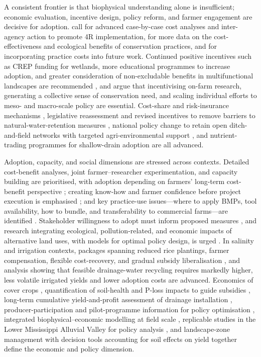 A consistent frontier is that biophysical understanding alone is insufficient; economic evaluation, incentive design, policy reform, and farmer engagement are decisive for adoption. \textcite{Liu2021} call for advanced case-by-case cost analyses and inter-agency action to promote 4R implementation, \textcite{Yuan2022} for more data on the cost-effectiveness and ecological benefits of conservation practices, and \textcite{McLellan2015} for incorporating practice costs into future work. Continued positive incentives such as CREP funding for wetlands, more educational programmes to increase adoption, and greater consideration of non-excludable benefits in multifunctional landscapes are recommended \parencite{Christianson2014}, and \textcite{David2015} argue that incentivising on-farm research, generating a collective sense of conservation need, and scaling individual efforts to meso- and macro-scale policy are essential. Cost-share and risk-insurance mechanisms \parencite{Jaynes2012,Karlen2005}, legislative reassessment and revised incentives to remove barriers to natural-water-retention measures \parencite{Kvítek2023}, national policy change to retain open ditch-and-field networks with targeted agri-environmental support \parencite{Marja2013}, and nutrient-trading programmes for shallow-drain adoption \parencite{Ghane2021b} are all advanced.

Adoption, capacity, and social dimensions are stressed across contexts. Detailed cost-benefit analyses, joint farmer--researcher experimentation, and capacity building are prioritised, with adoption depending on farmers' long-term cost-benefit perspective \parencite{Okwany2016}; creating know-how and farmer confidence before project execution is emphasised \parencite{Ghumman2011}; and key practice-use issues---where to apply BMPs, tool availability, how to bundle, and transferability to commercial farms---are identified \parencite{Ward2018}. Stakeholder willingness to adopt must inform proposed measures \parencite{Cuevas2019}, and research integrating ecological, pollution-related, and economic impacts of alternative land uses, with models for optimal policy design, is urged \parencite{Saikkonen2014}. In salinity and irrigation contexts, packages spanning reduced rice plantings, farmer compensation, flexible cost-recovery, and gradual subsidy liberalisation \parencite{Kotb2000}, and analysis showing that feasible drainage-water recycling requires markedly higher, less volatile irrigated yields and lower adoption costs \parencite{Sellars2022} are advanced. Economics of cover crops \parencite{Waring2020}, quantification of soil-health and P-loss impacts to guide subsidies \parencite{Roth2018}, long-term cumulative yield-and-profit assessment of drainage installation \parencite{Mourtzinis2021}, producer-participation and pilot-programme information for policy optimisation \parencite{Malone2023}, integrated biophysical--economic modelling at field scale \parencite{Ferin2023}, replicable studies in the Lower Mississippi Alluvial Valley for policy analysis \parencite{Kröger2012}, and landscape-zone management with decision tools accounting for soil effects on yield \parencite{Bakhsh2007b,Nelson2011,Kanwar1997} together define the economic and policy dimension.


